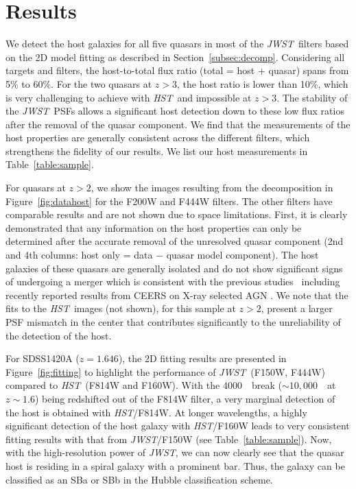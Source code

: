 \documentclass[twocolumn,]{aastex631}
\newcommand{\hst}{{\it HST}}
\newcommand{\jwst}{{\it JWST}}
\newcommand{\angstrom}{\text{\normalfont\AA}}
\begin{document}
\section{Results} \label{sec:result}
We detect the host galaxies for all five quasars in most of the \jwst\ filters based on the 2D model fitting as described in Section~\ref{subsec:decomp}. Considering all targets and filters, the host-to-total flux ratio (total = host + quasar) spans from 5\% to 60\%. For the two quasars at $z>3$, the host ratio is lower than 10\%, which is very challenging to achieve with \hst\ and impossible at $z>3$. The stability of the \jwst\ PSFs allows a significant host detection down to these low flux ratios after the removal of the quasar component. We find that the measurements of the host properties are generally consistent across the different filters, which strengthens the fidelity of our results. We list our host measurements in Table~\ref{table:sample}.

For quasars at $z>2$, we show the images resulting from the decomposition in Figure~\ref{fig:datahost} for the F200W and F444W filters. The other filters have comparable results and are not shown due to space limitations. First, it is clearly demonstrated that any information on the host properties can only be determined after the accurate removal of the unresolved quasar component (2nd and 4th columns: host only = data $-$ quasar model component). The host galaxies of these quasars are generally isolated and do not show significant signs of undergoing a merger which is consistent with the previous studies~\citep[e.g.,][]{Cisternas2011,Kocevski2012,Ding2020} including recently reported results from CEERS on X-ray selected AGN \citep{Kocevski2022}.  We note that the fits to the \hst\ images (not shown), for this sample at $z>2$, present a larger PSF mismatch in the center that contributes significantly to the unreliability of the detection of the host. 


For SDSS1420A ($z=1.646$), the 2D fitting results are presented in Figure~\ref{fig:fitting} to highlight the performance of \jwst\ (F150W, F444W) compared to \hst\ (F814W and F160W). With the 4000~\angstrom\ break ($\sim 10,000$~\angstrom\ at $z\sim1.6$) being redshifted out of the F814W filter, a very marginal detection of the host is obtained with \hst/F814W. At longer wavelengths, a highly significant detection of the host galaxy with \hst/F160W leads to very consistent fitting results with that from \jwst/F150W (see Table~\ref{table:sample}). Now, with the high-resolution power of \jwst, we can now clearly see that the quasar host is residing in a spiral galaxy with a prominent bar. Thus, the galaxy can be classified as an SBa or SBb in the Hubble classification scheme. 
\end{document}
